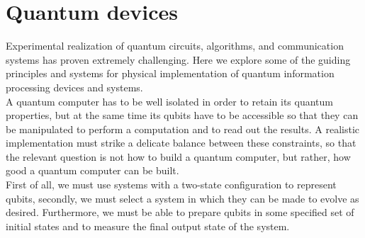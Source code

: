 \section{Quantum devices}
Experimental realization of quantum circuits, algorithms, and communication systems has proven extremely challenging. Here we explore some of the guiding principles and systems for physical implementation of quantum information processing devices and systems. \\
A quantum computer has to be well isolated in order to retain its quantum properties, but at the same time its qubits have to be accessible so that they can be manipulated to perform a computation and to read out the results. A realistic implementation must strike a delicate balance between these constraints, so that the relevant question is not how to build a quantum computer, but rather, how good a quantum computer can be built. \\
First of all, we must use systems with a two-state configuration to represent qubits, secondly, we must select a system in which they can be made to evolve as desired. Furthermore, we must be able to prepare qubits in some specified set of initial states and to measure the final output state of the system. \\
